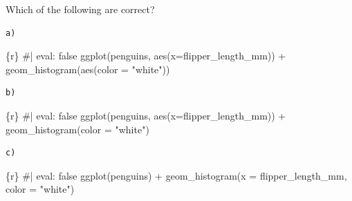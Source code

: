 \documentclass[
  letterpaper,
  DIV=11,
  numbers=noendperiod]{scrreprt}
\newenvironment{Shaded}{\begin{snugshade}}{\end{snugshade}}
\newcommand{\AttributeTok}[1]{\textcolor[rgb]{0.40,0.45,0.13}{#1}}
\newcommand{\CommentTok}[1]{\textcolor[rgb]{0.37,0.37,0.37}{#1}}
\newcommand{\FunctionTok}[1]{\textcolor[rgb]{0.28,0.35,0.67}{#1}}
\newcommand{\InformationTok}[1]{\textcolor[rgb]{0.37,0.37,0.37}{#1}}
\newcommand{\NormalTok}[1]{\textcolor[rgb]{0.00,0.23,0.31}{#1}}
\newcommand{\SpecialCharTok}[1]{\textcolor[rgb]{0.37,0.37,0.37}{#1}}
\newcommand{\StringTok}[1]{\textcolor[rgb]{0.13,0.47,0.30}{#1}}
\begin{document}
\begin{tcolorbox}[enhanced jigsaw, colframe=quarto-callout-note-color-frame, breakable, colback=white, toprule=.15mm, leftrule=.75mm, left=2mm, opacityback=0, rightrule=.15mm, arc=.35mm, bottomrule=.15mm]

Which of the following are correct?

\begin{verbatim}
a)  
\end{verbatim}

\begin{Shaded}
\begin{Highlighting}[]
\InformationTok{\textasciigrave{}\textasciigrave{}\textasciigrave{}\{r\}}
\CommentTok{\#| eval: false}
\FunctionTok{ggplot}\NormalTok{(penguins, }\FunctionTok{aes}\NormalTok{(}\AttributeTok{x=}\NormalTok{flipper\_length\_mm)) }\SpecialCharTok{+}
  \FunctionTok{geom\_histogram}\NormalTok{(}\FunctionTok{aes}\NormalTok{(}\AttributeTok{color =} \StringTok{"white"}\NormalTok{))}
\InformationTok{\textasciigrave{}\textasciigrave{}\textasciigrave{}}
\end{Highlighting}
\end{Shaded}

\begin{verbatim}
b)  
\end{verbatim}

\begin{Shaded}
\begin{Highlighting}[]
\InformationTok{\textasciigrave{}\textasciigrave{}\textasciigrave{}\{r\}}
\CommentTok{\#| eval: false}
\FunctionTok{ggplot}\NormalTok{(penguins, }\FunctionTok{aes}\NormalTok{(}\AttributeTok{x=}\NormalTok{flipper\_length\_mm)) }\SpecialCharTok{+}
  \FunctionTok{geom\_histogram}\NormalTok{(}\AttributeTok{color =} \StringTok{"white"}\NormalTok{)}
\InformationTok{\textasciigrave{}\textasciigrave{}\textasciigrave{}}
\end{Highlighting}
\end{Shaded}

\begin{verbatim}
c)  
\end{verbatim}

\begin{Shaded}
\begin{Highlighting}[]
\InformationTok{\textasciigrave{}\textasciigrave{}\textasciigrave{}\{r\}}
\CommentTok{\#| eval: false}
\FunctionTok{ggplot}\NormalTok{(penguins) }\SpecialCharTok{+}
  \FunctionTok{geom\_histogram}\NormalTok{(}\AttributeTok{x =}\NormalTok{ flipper\_length\_mm, }\AttributeTok{color =} \StringTok{"white"}\NormalTok{)}
\InformationTok{\textasciigrave{}\textasciigrave{}\textasciigrave{}}
\end{Highlighting}
\end{Shaded}


\end{tcolorbox}
\end{document}
